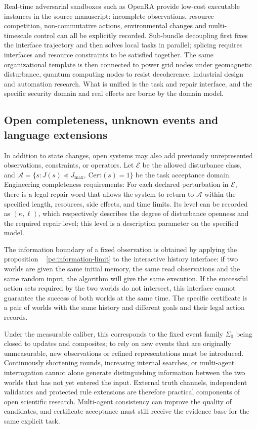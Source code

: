 \documentclass[11pt,a4paper]{article}
\theoremstyle{plain}
\theoremstyle{definition}
\theoremstyle{remark}
\begin{document}
\begin{CJK*}
Real-time adversarial sandboxes such as OpenRA provide low-cost executable instances in the source manuscript: incomplete observations, resource competition, non-commutative actions, environmental changes and multi-timescale control can all be explicitly recorded. Sub-bundle decoupling first fixes the interface trajectory and then solves local tasks in parallel; splicing requires interfaces and resource constraints to be satisfied together. The same organizational template is then connected to power grid nodes under geomagnetic disturbance, quantum computing nodes to resist decoherence, industrial design and automation research. What is unified is the task and repair interface, and the specific security domain and real effects are borne by the domain model. \cite{S14,S16}

\subsection { Open completeness, unknown events and language extensions }

In addition to state changes, open systems may also add previously unrepresented observations, constraints, or operators. Let $\mathcal E$ be the allowed disturbance class, and $\mathcal A=\{s:J(s)\preceq J_{\max},\ \mathrm{Cert}(s)=1\}$ be the task acceptance domain. Engineering completeness requirements: For each declared perturbation in $\mathcal E$, there is a legal repair word that allows the system to return to $\mathcal A$ within the specified length, resources, side effects, and time limits. Its level can be recorded as $(\kappa,\ell)$, which respectively describes the degree of disturbance openness and the required repair level; this level is a description parameter on the specified model. \cite{S15}

The information boundary of a fixed observation is obtained by applying the proposition ~ \ref{pc:information-limit} to the interactive history interface: if two worlds are given the same initial memory, the same read observations and the same random input, the algorithm will give the same execution. If the successful action sets required by the two worlds do not intersect, this interface cannot guarantee the success of both worlds at the same time. The specific certificate is a pair of worlds with the same history and different goals and their legal action records.

Under the measurable caliber, this corresponds to the fixed event family $\Sigma_0$ being closed to updates and composites; to rely on new events that are originally unmeasurable, new observations or refined representations must be introduced. Continuously shortening rounds, increasing internal searches, or multi-agent interrogation cannot alone generate distinguishing information between the two worlds that has not yet entered the input. External truth channels, independent validators and protected rule extensions are therefore practical components of open scientific research. Multi-agent consistency can improve the quality of candidates, and certificate acceptance must still receive the evidence base for the same explicit task. \cite{S14,S15,S16}


\end{CJK*}
\end{document}
